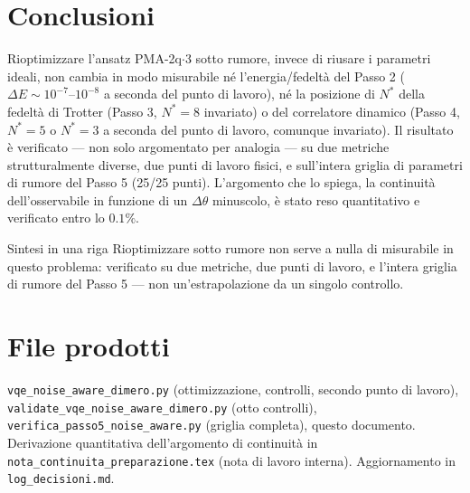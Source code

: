 \documentclass[11pt,a4paper]{article}
\begin{document}
\section{Conclusioni}

Rioptimizzare l'ansatz PMA-2q$\cdot$3 sotto rumore, invece di riusare i
parametri ideali, non cambia in modo misurabile né l'energia/fedeltà del
Passo 2 ($\Delta E\sim10^{-7}$--$10^{-8}$ a seconda del punto di lavoro),
né la posizione di $N^*$ della fedeltà di Trotter (Passo 3, $N^*=8$
invariato) o del correlatore dinamico (Passo 4, $N^*=5$ o $N^*=3$ a
seconda del punto di lavoro, comunque invariato). Il risultato è
verificato --- non solo argomentato per analogia --- su due metriche
strutturalmente diverse, due punti di lavoro fisici, e sull'intera
griglia di parametri di rumore del Passo 5 (25/25 punti). L'argomento
che lo spiega, la continuità dell'osservabile in funzione di un
$\Delta\theta$ minuscolo, è stato reso quantitativo e verificato entro lo
$0.1\%$.

\begin{okbox}{Sintesi in una riga}
Rioptimizzare sotto rumore non serve a nulla di misurabile in questo
problema: verificato su due metriche, due punti di lavoro, e l'intera
griglia di rumore del Passo 5 --- non un'estrapolazione da un singolo
controllo.
\end{okbox}

\section*{File prodotti}

\texttt{vqe\_noise\_aware\_dimero.py} (ottimizzazione, controlli, secondo
punto di lavoro), \texttt{validate\_vqe\_noise\_aware\_dimero.py} (otto
controlli), \texttt{verifica\_passo5\_noise\_aware.py} (griglia
completa), questo documento. Derivazione quantitativa dell'argomento di
continuità in \texttt{nota\_continuita\_preparazione.tex} (nota di lavoro
interna). Aggiornamento in \texttt{log\_decisioni.md}.
\end{document}

